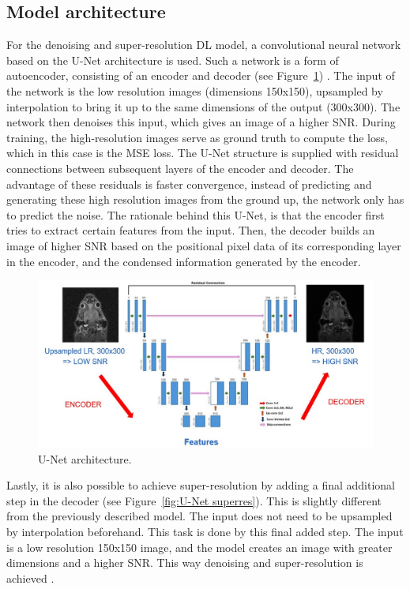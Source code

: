 \documentclass[twocolumn]{article}
\begin{document}
\subsection{Model architecture}
For the denoising and super-resolution DL model, a convolutional neural network based on the U-Net architecture is used. 
Such a network is a form of autoencoder, consisting of an encoder and decoder (see Figure~\ref{fig:U-Net}) \cite{ronneberger2015unet}.
The input of the network is the low resolution images (dimensions 150x150), upsampled by interpolation to bring it up to the same dimensions of the output (300x300). 
The network then denoises this input, which gives an image of a higher SNR. During training, the high-resolution images serve as ground truth to compute the loss, which in this case is the MSE loss. 
The U-Net structure is supplied with residual connections between subsequent layers of the encoder and decoder. 
The advantage of these residuals is faster convergence, instead of predicting and generating these high resolution images from the ground up, the network only has to predict the noise. 
The rationale behind this U-Net, is that the encoder first tries to extract certain features from the input. 
Then, the decoder builds an image of higher SNR based on the positional pixel data of its corresponding layer in the encoder, and the condensed information generated by the encoder. 

\begin{figure}
    \centering
    \includegraphics[width=0.85\linewidth]{U-Net.jpg}
    \caption{U-Net architecture.}
    \label{fig:U-Net}
\end{figure}

Lastly, it is also possible to achieve super-resolution by adding a final additional step in the decoder (see Figure~\ref{fig:U-Net superres}). 
This is slightly different from the previously described model. The input does not need to be upsampled by interpolation beforehand. 
This task is done by this final added step. The input is a low resolution 150x150 image, and the model creates an image with greater dimensions and a higher SNR. 
This way denoising and super-resolution is achieved \cite{tran2025unet}. 
\end{document}
